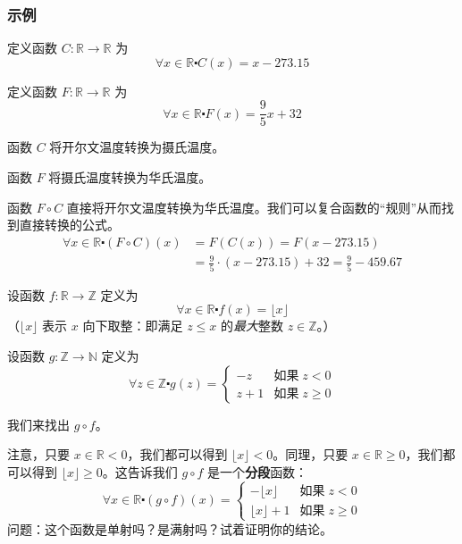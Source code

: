 \subsubsection*{示例}

\begin{example}
    定义函数 $ C : \mathbb{R} \to \mathbb{R}$ 为
    \[\forall x \in \mathbb{R} \centerdot C(x) = x - 273.15\]

    定义函数 $ F : \mathbb{R} \to \mathbb{R}$ 为
    \[\forall x \in \mathbb{R} \centerdot F(x) = \frac{9}{5}x + 32\]

    函数 $C$ 将开尔文温度转换为摄氏温度。

    函数 $F$ 将摄氏温度转换为华氏温度。

    函数 $F \circ C$ 直接将开尔文温度转换为华氏温度。我们可以复合函数的``规则''从而找到直接转换的公式。
    \begin{align*}
        \forall x \in \mathbb{R} \centerdot (F \circ C)(x) & = F(C(x)) = F(x - 273.15)                                  \\
                                                           & = \frac{9}{5} \cdot (x - 273.15) + 32 = \frac{9}{5}-459.67
    \end{align*}
\end{example}

\begin{example}
    设函数 $f : \mathbb{R} \to \mathbb{Z}$ 定义为
    \[\forall x \in \mathbb{R} \centerdot f(x) = \lfloor x \rfloor\]
    （$\lfloor x \rfloor$ 表示 $x$ 向下取整：即满足 $z \le x$ 的\emph{最大}整数 $z \in \mathbb{Z}$。）

    设函数 $g : \mathbb{Z} \to \mathbb{N}$ 定义为
    \[\forall z \in \mathbb{Z} \centerdot g(z) = \begin{cases}
            -z  & \text{如果}\;z<0     \\
            z+1 & \text{如果}\;z \ge 0
        \end{cases}\]

    我们来找出 $g \circ f$。

    注意，只要 $x \in \mathbb{R} < 0$，我们都可以得到 $\lfloor x \rfloor < 0$。同理，只要 $x \in \mathbb{R} \ge 0$，我们都可以得到 $\lfloor x \rfloor \ge 0$。这告诉我们 $g \circ f$ 是一个\textbf{分段}函数：
    \[\forall x \in \mathbb{R} \centerdot (g \circ f)(x) = \begin{cases}
            -\lfloor x \rfloor  & \text{如果}\;z<0     \\
            \lfloor x \rfloor+1 & \text{如果}\;z \ge 0
        \end{cases}\]
    问题：这个函数是单射吗？是满射吗？试着证明你的结论。
\end{example}

